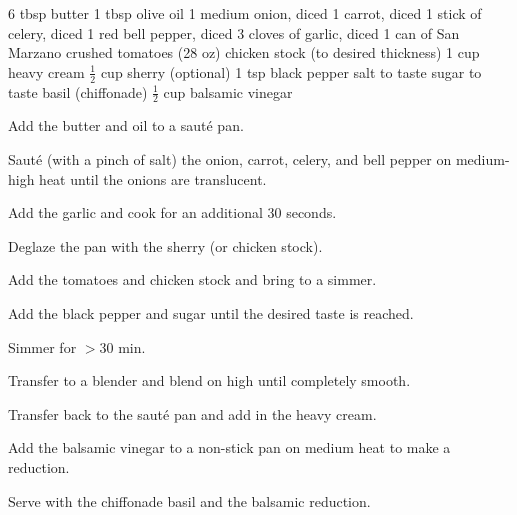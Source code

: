 \dishtype{}
\begin{ingreds}
    6 tbsp butter
    1 tbsp olive oil
    1 medium onion, diced
    1 carrot, diced
    1 stick of celery, diced
    1 red bell pepper, diced
    3 cloves of garlic, diced
    1 can of San Marzano crushed tomatoes (28 oz)
    chicken stock (to desired thickness)
    1 cup heavy cream
    $\frac{1}{2}$ cup sherry (optional)
    1 tsp black pepper
    salt to taste
    sugar to taste
    basil (chiffonade)
    $\frac{1}{2}$ cup balsamic vinegar   
\end{ingreds}
\begin{method}
    Add the butter and oil to a saut\'e pan.\par
    Saut\'e (with a pinch of salt) the onion, carrot, celery, and bell pepper on medium-high heat until the onions are translucent.\par
    Add the garlic and cook for an additional 30 seconds.\par
    Deglaze the pan with the sherry (or chicken stock).\par
    Add the tomatoes and chicken stock and bring to a simmer.\par
    Add the black pepper and sugar until the desired taste is reached.\par
    Simmer for $>$30 min.\par
    Transfer to a blender and blend on high until completely \linebreak smooth.\par
    Transfer back to the saut\'e pan and add in the heavy cream.\par
    Add the balsamic vinegar to a non-stick pan on medium heat to make a reduction.\par
    Serve with the chiffonade basil and the balsamic reduction.
\end{method}